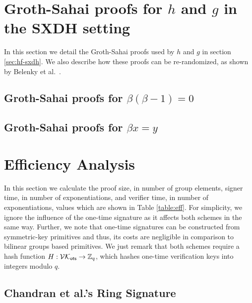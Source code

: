 \documentclass{llncs}
\begin{document}
	\section{Groth-Sahai proofs for $h$ and $g$ in the SXDH setting}
	
	In this section we detail the Groth-Sahai proofs used by $h$ and $g$ in section \ref{sec:hf-sxdh}. We also describe how these proofs can be re-randomized, as shown by Belenky et al.~\cite{C:BCCKLS09}.
		\subsection{Groth-Sahai proofs for $\beta(\beta-1)=0$} \label{sec:GSproofs-h}
		
			
			
		\subsection{Groth-Sahai proofs for $\beta x = y$} \label{sec:GSproofs-g}
		
			

%

	\section{Efficiency Analysis} \label{sec:eff-analysis}
		In this section we calculate the proof size, in number of group elements, signer time, in number of exponentiations, and verifier time, in number of exponentiations, values which are shown in Table \ref{table:eff}. For simplicity, we ignore the influence of the one-time signature as it affects both schemes in the same way. Further, we note that one-time signatures can be constructed from symmetric-key primitives and thus, its costs are negligible in comparison to bilinear groups based primitives. We just remark that both schemes require a hash function $H:\mathcal{VK}_{\mathsf{ots}}\to\mathbb{Z}_q$, which hashes one-time verification keys into integers modulo $q$.
		\subsection{Chandran et al.'s Ring Signature}
			
\end{document}
